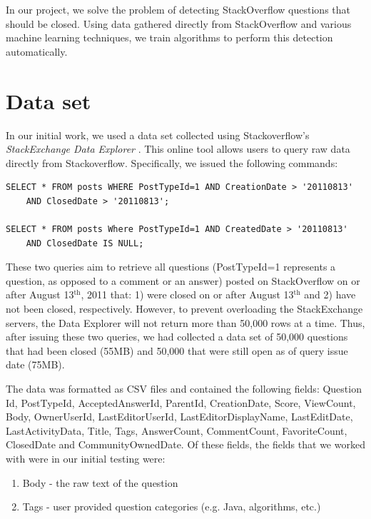 \documentclass[11pt]{article}
\begin{document}
\noindent In our project, we solve the problem of detecting StackOverflow
questions that should be closed.  Using data gathered directly from
StackOverflow and various machine learning techniques, we train
algorithms to perform this detection automatically.

\section{Data set}
In our initial work, we used a data set collected using
Stackoverflow's \emph{StackExchange Data Explorer}
\cite{website:stackexchange}. This online tool
allows users to query raw data directly from
Stackoverflow. Specifically, we issued the following commands:

\begin{verbatim}
SELECT * FROM posts WHERE PostTypeId=1 AND CreationDate > '20110813'
    AND ClosedDate > '20110813';

SELECT * FROM posts Where PostTypeId=1 AND CreatedDate > '20110813'
    AND ClosedDate IS NULL;
\end{verbatim}

These two queries aim to retrieve all questions (PostTypeId=1 represents a question, as opposed to a comment or an answer) posted on StackOverflow on or after August 13$^{\textrm{th}}$, 2011 that: 1)
were closed on or after August 13$^{\textrm{th}}$ and 2) have not been
closed, respectively.  However, to prevent overloading the StackExchange servers, the Data
Explorer will not return more than 50,000 rows at a time.  Thus, after
issuing these two queries, we had collected a data set of 50,000
questions that had been closed (55MB) and 50,000 that were still open as of
query issue date (75MB).

The data was formatted as CSV files and contained the following
fields: Question Id, PostTypeId, AcceptedAnswerId, ParentId,
CreationDate, Score, ViewCount, Body, OwnerUserId, LastEditorUserId,
LastEditorDisplayName, LastEditDate, LastActivityData, Title, Tags,
AnswerCount, CommentCount, FavoriteCount, ClosedDate and
CommunityOwnedDate. Of these fields, the fields that we worked with
were in our initial testing were:

\begin{enumerate}
  \item Body - the raw text of the question
  \item Tags - user provided question categories (e.g. Java,
    algorithms, etc.)
\end{enumerate}
\end{document}

